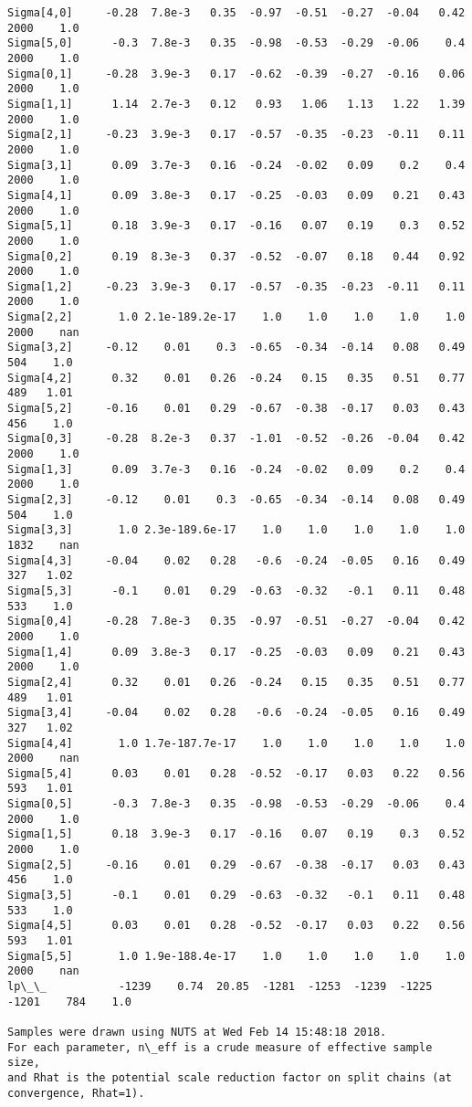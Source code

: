 \documentclass[11pt]{article}
\begin{document}
\begin{Verbatim}[commandchars=\\\{\}]
Sigma[4,0]     -0.28  7.8e-3   0.35  -0.97  -0.51  -0.27  -0.04   0.42   2000    1.0
Sigma[5,0]      -0.3  7.8e-3   0.35  -0.98  -0.53  -0.29  -0.06    0.4   2000    1.0
Sigma[0,1]     -0.28  3.9e-3   0.17  -0.62  -0.39  -0.27  -0.16   0.06   2000    1.0
Sigma[1,1]      1.14  2.7e-3   0.12   0.93   1.06   1.13   1.22   1.39   2000    1.0
Sigma[2,1]     -0.23  3.9e-3   0.17  -0.57  -0.35  -0.23  -0.11   0.11   2000    1.0
Sigma[3,1]      0.09  3.7e-3   0.16  -0.24  -0.02   0.09    0.2    0.4   2000    1.0
Sigma[4,1]      0.09  3.8e-3   0.17  -0.25  -0.03   0.09   0.21   0.43   2000    1.0
Sigma[5,1]      0.18  3.9e-3   0.17  -0.16   0.07   0.19    0.3   0.52   2000    1.0
Sigma[0,2]      0.19  8.3e-3   0.37  -0.52  -0.07   0.18   0.44   0.92   2000    1.0
Sigma[1,2]     -0.23  3.9e-3   0.17  -0.57  -0.35  -0.23  -0.11   0.11   2000    1.0
Sigma[2,2]       1.0 2.1e-189.2e-17    1.0    1.0    1.0    1.0    1.0   2000    nan
Sigma[3,2]     -0.12    0.01    0.3  -0.65  -0.34  -0.14   0.08   0.49    504    1.0
Sigma[4,2]      0.32    0.01   0.26  -0.24   0.15   0.35   0.51   0.77    489   1.01
Sigma[5,2]     -0.16    0.01   0.29  -0.67  -0.38  -0.17   0.03   0.43    456    1.0
Sigma[0,3]     -0.28  8.2e-3   0.37  -1.01  -0.52  -0.26  -0.04   0.42   2000    1.0
Sigma[1,3]      0.09  3.7e-3   0.16  -0.24  -0.02   0.09    0.2    0.4   2000    1.0
Sigma[2,3]     -0.12    0.01    0.3  -0.65  -0.34  -0.14   0.08   0.49    504    1.0
Sigma[3,3]       1.0 2.3e-189.6e-17    1.0    1.0    1.0    1.0    1.0   1832    nan
Sigma[4,3]     -0.04    0.02   0.28   -0.6  -0.24  -0.05   0.16   0.49    327   1.02
Sigma[5,3]      -0.1    0.01   0.29  -0.63  -0.32   -0.1   0.11   0.48    533    1.0
Sigma[0,4]     -0.28  7.8e-3   0.35  -0.97  -0.51  -0.27  -0.04   0.42   2000    1.0
Sigma[1,4]      0.09  3.8e-3   0.17  -0.25  -0.03   0.09   0.21   0.43   2000    1.0
Sigma[2,4]      0.32    0.01   0.26  -0.24   0.15   0.35   0.51   0.77    489   1.01
Sigma[3,4]     -0.04    0.02   0.28   -0.6  -0.24  -0.05   0.16   0.49    327   1.02
Sigma[4,4]       1.0 1.7e-187.7e-17    1.0    1.0    1.0    1.0    1.0   2000    nan
Sigma[5,4]      0.03    0.01   0.28  -0.52  -0.17   0.03   0.22   0.56    593   1.01
Sigma[0,5]      -0.3  7.8e-3   0.35  -0.98  -0.53  -0.29  -0.06    0.4   2000    1.0
Sigma[1,5]      0.18  3.9e-3   0.17  -0.16   0.07   0.19    0.3   0.52   2000    1.0
Sigma[2,5]     -0.16    0.01   0.29  -0.67  -0.38  -0.17   0.03   0.43    456    1.0
Sigma[3,5]      -0.1    0.01   0.29  -0.63  -0.32   -0.1   0.11   0.48    533    1.0
Sigma[4,5]      0.03    0.01   0.28  -0.52  -0.17   0.03   0.22   0.56    593   1.01
Sigma[5,5]       1.0 1.9e-188.4e-17    1.0    1.0    1.0    1.0    1.0   2000    nan
lp\_\_           -1239    0.74  20.85  -1281  -1253  -1239  -1225  -1201    784    1.0

Samples were drawn using NUTS at Wed Feb 14 15:48:18 2018.
For each parameter, n\_eff is a crude measure of effective sample size,
and Rhat is the potential scale reduction factor on split chains (at 
convergence, Rhat=1).

    \end{Verbatim}
\end{document}
